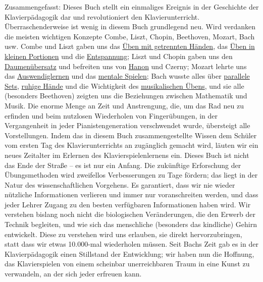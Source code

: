 Zusammengefasst: Dieses Buch stellt ein einmaliges Ereignis in der Geschichte der Klavierpädagogik dar und revolutioniert den Klavierunterricht.
Überraschenderweise ist wenig in diesem Buch grundlegend neu.
Wird verdanken die meisten wichtigen Konzepte Combe, Liszt, Chopin, Beethoven, Mozart, Bach usw.
Combe und Liszt gaben uns das \hyperref[c1ii7]{Üben mit getrennten Händen}, das \hyperref[c1ii6]{Üben in kleinen Portionen} und die \hyperref[c1ii14]{Entspannung};
Liszt und Chopin gaben uns den \hyperref[c1iii5b]{Daumenübersatz} und befreiten uns von \hyperref[c1iii7h]{Hanon} und Czerny;
Mozart lehrte uns das \hyperref[c1iii6]{Auswendiglernen} und das \hyperref[c1ii12mental]{mentale Spielen};
Bach wusste alles über \hyperref[c1ii11]{parallele Sets}, \hyperref[ruhig]{ruhige Hände} und die Wichtigkeit des \hyperref[c1iii14d]{musikalischen Übens},
und sie alle (besonders Beethoven) zeigten uns die Beziehungen zwischen Mathematik und Musik.
Die enorme Menge an Zeit und Anstrengung, die, um das Rad neu zu erfinden und beim nutzlosen Wiederholen von Fingerübungen, in der Vergangenheit in jeder Pianistengeneration verschwendet wurde, übersteigt alle Vorstellungen.
Indem das in diesem Buch zusammengestellte Wissen dem Schüler vom ersten Tag des Klavierunterrichts an zugänglich gemacht wird, läuten wir ein neues Zeitalter im Erlernen des Klavierspielenlernens ein.
Dieses Buch ist nicht das Ende der Straße -- es ist nur ein Anfang.
Die zukünftige Erforschung der Übungsmethoden wird zweifellos Verbesserungen zu Tage fördern; das liegt in der Natur des wissenschaftlichen Vorgehens.
Es garantiert, dass wir nie wieder nützliche Informationen verlieren und immer nur voranschreiten werden, und dass jeder Lehrer Zugang zu den besten verfügbaren Informationen haben wird.
Wir verstehen bislang noch nicht die biologischen Veränderungen, die den Erwerb der Technik begleiten, und wie sich das menschliche (besonders das kindliche) Gehirn entwickelt.
Diese zu verstehen wird uns erlauben, sie direkt hervorzubringen, statt dass wir etwas 10.000-mal wiederholen müssen.
Seit Bachs Zeit gab es in der Klavierpädagogik einen Stillstand der Entwicklung; wir haben nun die Hoffnung, das Klavierspielen von einem scheinbar unerreichbaren Traum in eine Kunst zu verwandeln, an der sich jeder erfreuen kann.

